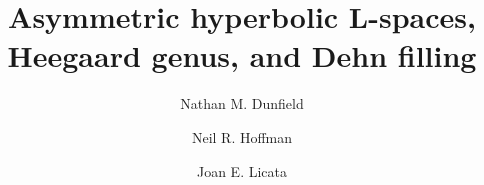 \title{Asymmetric hyperbolic L-spaces, \\ 
\mbox{}\hspace{1.5cm} Heegaard genus, and Dehn filling}

\author{Nathan M. Dunfield}
\address{ Dept.~of Math., MC-382 \\
          University of Illinois \\
          1409 W. Green St. \\
          Urbana, IL 61801 \\ 
          USA
}

\author{Neil R. Hoffman}
\address{Dept.~of Math. and Stat. \\
University of Melbourne\\
Parkville, VIC 3010 \\
Australia}

\author{Joan E. Licata}
\address{Mathematical Sciences Institute\\
John Dedman Bldg 27\\
The Australian National University 0200\\
 Australia}

\arxivreference{}
\arxivpassword{}



\newcommand{\centercolhead}[1]{\multicolumn{1}{c}{#1}}
\newcommand{\Na}{N_\alpha}
\newcommand{\Nb}{N_\beta}
\newcommand{\HoneZ}[1]{H_1(#1; \Z)}
\newcommand{\HoneZbdryN}{\HoneZ{\partial N}}
\newcommand{\ZHS}{$\Z \mathrm{HS}$}
\newcommand{\tilt}[1]{\mathrm{Tilt}\!\left(#1\right)}
\newcommand{\interval}[1]{[#1]}
\newcommand{\inta}{\interval{a}}
\newcommand{\intb}{\interval{b}}
\newcommand{\intC}{\interval{C}}
\newcommand{\intCone}{\interval{C_1}}
\newcommand{\intCzero}{\interval{C_0}}
\newcommand{\intCp}{\interval{C^+_1}}
\newcommand{\intCm}{\interval{C^-_1}}
\newcommand{\inputfig}[1]{}



